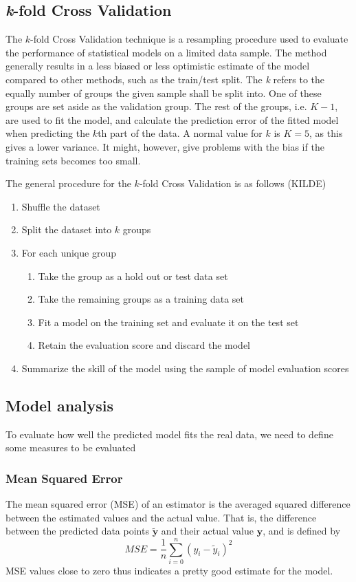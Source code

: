\documentclass{article}
\begin{document}
\subsection{\textit{k}-fold Cross Validation}
The $k$-fold Cross Validation technique is a resampling procedure used to evaluate the performance of statistical models on a limited data sample. The method generally results in a less biased or less optimistic estimate of the model compared to other methods, such as the train/test split. The \textit{k} refers to the equally number of groups the given sample shall be split into. One of these groups are set aside as the validation group. The rest of the groups, i.e. $K-1$, are used to fit the model, and calculate the prediction error of the fitted model when predicting the $k$th part of the data. A normal value for $k$ is $K=5$, as this gives a lower variance. It might, however, give problems with the bias if the training sets becomes too small.

The general procedure for the $k$-fold Cross Validation is as follows (KILDE)
\begin{enumerate}
\item Shuffle the dataset
\item Split the dataset into $k$ groups
\item For each unique group
\begin{enumerate}
\item Take the group as a hold out or test data set
\item Take the remaining groups as a training data set
\item Fit a model on the training set and evaluate it on the test set
\item Retain the evaluation score and discard the model
\end{enumerate}
	
\item Summarize the skill of the model using the sample of model evaluation scores
\end{enumerate}

\subsection{Model analysis}
To evaluate how well the predicted model fits the real data, we need to define some measures to be evaluated
\subsubsection{Mean Squared Error}
The mean squared error (MSE) of an estimator is the averaged squared difference between the estimated values and the actual value. That is, the difference between the predicted data points $\tilde{\textbf{y}}$ and their actual value $\textbf{y}$, and is defined by
\begin{equation}\label{MSE}
MSE = \frac{1}{n} \sum_{i=0}^{n}(y_{i} - \tilde{y}_{i})^{2}
\end{equation}
MSE values close to zero thus indicates a pretty good estimate for the model.
\end{document}
